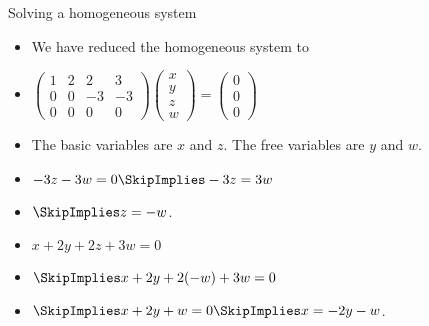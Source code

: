 \documentclass{beamer}
\begin{document}
\begin{frame}{Solving a homogeneous system}

\begin{itemize}
\item We have reduced the homogeneous system to
\item
$
\begin{pmatrix}
1 & 2 & 2 & 3 \\
0 & 0 & -3 & -3 \\
0 & 0 & 0 & 0
\end{pmatrix}
\begin{pmatrix}
x \\ y \\ z \\ w
\end{pmatrix}
=
\begin{pmatrix}
0 \\ 0 \\  0
\end{pmatrix}
$
\item The basic variables are $x$ and $z$. The free variables are $y$ and $w$.
\item $-3z -3w = 0 \SkipImplies -3z = 3w $
\item $ \SkipImplies z = - w$.
\item $x + 2y +2z +3w = 0 $
\item $\SkipImplies x +2y + 2(-w) + 3w = 0$
\item $\SkipImplies x + 2y  + w = 0 \SkipImplies x = -2y - w$.
\end{itemize}
\end{frame}
\end{document}

